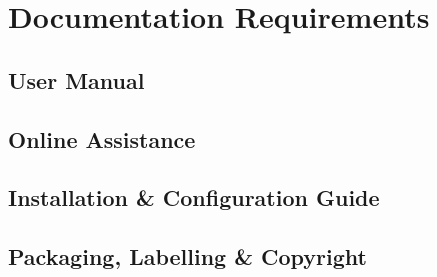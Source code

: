 \documentclass[12pt,a4paper,oneside, titlepage]{article}
\begin{document}
	\section{Documentation Requirements}
	\subsection{User Manual}
	\subsection{Online Assistance}
	\subsection{Installation \& Configuration Guide}
	\subsection{Packaging, Labelling \& Copyright}
    \newpage
    {}
    
\end{document}
